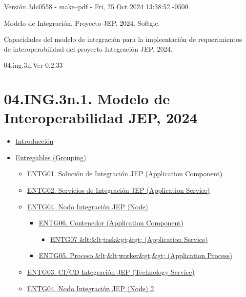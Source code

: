 \documentclass[
  paper=a4,
  ,captions=tableheading
]{scrartcl}
\providecommand{\tightlist}{%
  \setlength{\itemsep}{0pt}\setlength{\parskip}{0pt}}
\begin{document}
Versión 3dc0558 - make--pdf - Fri, 25 Oct 2024 13:38:52 -0500

Modelo de Integración. Proyecto JEP, 2024. Softgic.

Capacidades del modelo de integración para la impleentación de
requerimientos de interoperabilidad del proyecto Integración JEP, 2024.

04.ing.3n.Ver 0.2.33

\section{04.ING.3n.1. Modelo de Interoperabilidad JEP,
2024}\label{sec:ing.3n.1.-modelo-de-interoperabilidad-jep-2024-1}

\begin{itemize}
\tightlist
\item
  \hyperref[Introducciuxf3n]{Introducción}
\item
  \hyperref[entregables-grouping]{Entregables (Grouping)}

  \begin{itemize}
  \tightlist
  \item
    \hyperref[entg01.-soluciuxf3n-de-integraciuxf3n-jep-application-component]{ENTG01.
    Solución de Integración JEP (Application Component)}
  \item
    \hyperref[entg02.-servicios-de-integraciuxf3n-jep-application-service]{ENTG02.
    Servicios de Integración JEP (Application Service)}
  \item
    \hyperref[entg04.-nodo-integraciuxf3n-jep-node]{ENTG04. Nodo
    Integración JEP (Node)}

    \begin{itemize}
    \tightlist
    \item
      \hyperref[entg06.-contenedor-application-component]{ENTG06.
      Contenedor (Application Component)}

      \begin{itemize}
      \tightlist
      \item
        \hyperref[entg07-ltlttaskgtgt-application-service]{ENTG07
        \&lt;\&lt;task\&gt;\&gt; (Application Service)}
      \end{itemize}
    \item
      \hyperref[entg05.-proceso-ltltworkergtgt-application-process]{ENTG05.
      Proceso \&lt;\&lt;worker\&gt;\&gt; (Application Process)}
    \end{itemize}
  \item
    \hyperref[entg03.-cicd-integraciuxf3n-jep-technology-service]{ENTG03.
    CI/CD Integración JEP (Technology Service)}
  \item
    \hyperref[entg04.-nodo-integraciuxf3n-jep-node-2]{ENTG04. Nodo
    Integración JEP (Node) 2}


\end{itemize}
\end{itemize}
\end{document}
